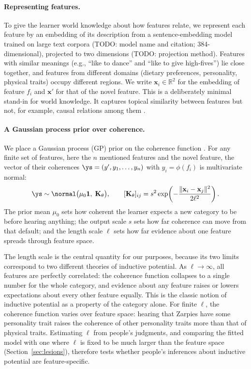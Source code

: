 \paragraph{Representing features.} To give the learner world knowledge about how
features relate, we represent each feature by an embedding of its description
from a sentence-embedding model trained on large text corpora
(TODO: model name and citation; 384-dimensional), projected to two dimensions
(TODO: projection method). Features with similar meanings (e.g., ``like to
dance'' and ``like to give high-fives'') lie close together, and features from
different domains (dietary preferences, personality, physical traits) occupy
different regions. We write $\mathbf{x}_i \in \mathbb{R}^2$ for the embedding of
feature $f_i$ and $\mathbf{x}'$ for that of the novel feature. This is a
deliberately minimal stand-in for world knowledge. It captures topical
similarity between features but not, for example, causal relations among them
\citep{rehder2003causalmodel}. %

\paragraph{A Gaussian process prior over coherence.} We place a Gaussian process
(GP) prior on the coherence function \citep{rasmussenwilliams2006gaussian}.
For any finite set of features, here the $n$ mentioned features and the novel
feature, the vector of their coherences
$\ys = (y', y_1, \ldots, y_n)$ with $y_i = \phi(f_i)$ is multivariate normal:
\begin{equation}
    \ys \sim \normal\big(\mu_0 \mathbf{1},\; \mathbf{K}_\theta\big), \qquad
    [\mathbf{K}_\theta]_{ij} = s^2 \exp\!\left(-\frac{\lVert \mathbf{x}_i - \mathbf{x}_j \rVert^2}{2\ell^2}\right).
    \label{eq:gp-prior}
\end{equation}
The prior mean $\mu_0$ sets how coherent the learner expects a new category to
be before hearing anything; the output scale $s$ sets how far coherence can move
from that default; and the length scale $\ell$ sets how far evidence about one
feature spreads through feature space.

The length scale is the central quantity for our purposes, because its two
limits correspond to two different theories of inductive potential. As
$\ell \to \infty$, all features are perfectly correlated: the coherence function
collapses to a single number for the whole category, and evidence about any
feature raises or lowers expectations about every other feature equally. This is
the classic notion of inductive potential as a property of the category alone.
For finite $\ell$, the coherence function varies over feature space: hearing that
Zarpies have some personality trait raises the coherence of other personality
traits more than that of physical traits. Estimating $\ell$ from people's
judgments, and comparing the fitted model with one where $\ell$ is fixed to be
much larger than the feature space (Section~\ref{sec:lesions}), therefore tests
whether people's inferences about inductive potential are feature-specific.

